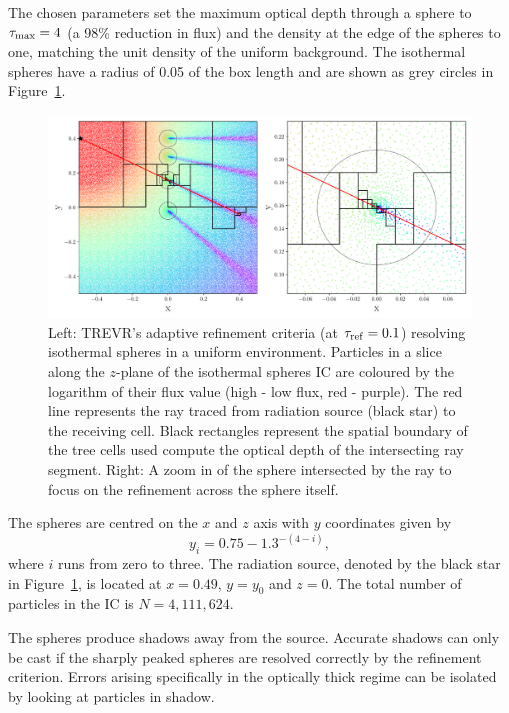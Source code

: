 \documentclass[fleq,usenatbib]{mnras}
\newcommand{\acro}{TREVR}
\newcommand{\tr}{\tau_{\rm ref}}
\begin{document}
{The chosen parameters set the maximum optical depth through a sphere to 
$\tau_{\rm max}=4$ (a 98\% reduction in flux) and the density at the edge of 
the spheres to one, matching the unit density of the uniform background. The 
isothermal spheres have a radius of 0.05 of the box length and are shown as 
grey circles in Figure~\ref{fig:cellplot}.  
\begin{figure}
\includegraphics[width=1\linewidth]{Figures/cellplot.pdf}
\caption{Left: \acro{}'s adaptive refinement criteria (at $\tr =0.1$) 
resolving isothermal spheres in a uniform environment. Particles in a slice 
along the $z$-plane of the isothermal spheres IC are coloured by the logarithm 
of their flux value (high - low flux, red - purple). The red line represents 
the ray traced from radiation source (black star) to the receiving cell. Black 
rectangles represent the spatial boundary of the tree cells used compute the 
optical depth of the intersecting ray segment. Right: A zoom in of the sphere 
intersected by the ray to focus on the refinement across the sphere itself.}
\label{fig:cellplot}
\end{figure}
The spheres are centred on the $x$ and $z$ axis with $y$ coordinates given by
\begin{equation}
y_i = 0.75 - 1.3^{-(4-i)},
\end{equation}
where $i$ runs from zero to three. The radiation source, denoted by the black 
star in Figure~\ref{fig:cellplot}, is located at $x=0.49$, $y=y_0$ and $z=0$. 
The total number of particles in the IC is $N=4,111,624$.

The spheres produce shadows away from the source. Accurate shadows can only be 
cast if the sharply peaked spheres are resolved correctly by the refinement 
criterion. Errors arising  specifically in the optically thick regime can be 
isolated by looking at particles in shadow.

}
\end{document}
